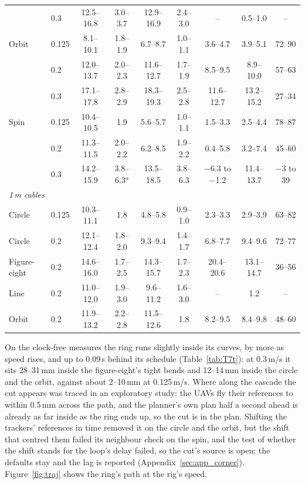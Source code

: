 \begin{table}[htbp]
\begin{tabular}{llccccccc}
 & 0.3 & 12.5--16.8 & 3.0--3.7 & 12.9--16.9 & 2.4--3.0 & -- & 0.5--1.0 & -- \\
\addlinespace
Orbit & 0.125 & 8.1--10.1 & 1.8--1.9 & 6.7--8.7 & 1.0--1.1 & 3.6--4.7 & 3.9--5.1 & 72--90 \\
 & 0.2 & 12.0--13.7 & 2.0--2.3 & 11.6--12.7 & 1.7--1.9 & 8.5--9.5 & 8.9--10.0 & 57--63 \\
 & 0.3 & 17.1--17.8 & 2.8--2.9 & 18.3--19.3 & 2.5--2.8 & 11.6--12.7 & 13.2--15.2 & 27--34 \\
\addlinespace
Spin & 0.125 & 10.4--10.5 & 1.9 & 5.6--5.7 & 1.0--1.1 & 1.5--3.3 & 2.5--4.4 & 78--87 \\
 & 0.2 & 11.3--11.5 & 2.0--2.2 & 6.2--8.5 & 1.9--2.2 & 0.4--5.8 & 3.2--7.4 & 45--60 \\
 & 0.3 & 14.2--15.9 & 3.8--6.3$^a$ & 13.5--18.5 & 3.8--6.3 & $-$6.3 to $-$1.2 & 11.4--13.7 & $-$3 to 39 \\
\midrule
\multicolumn{9}{l}{\emph{1\,m cables}} \\
Circle & 0.125 & 10.3--11.1 & 1.8 & 4.8--5.8 & 0.9--1.0 & 2.3--3.3 & 2.9--3.9 & 63--82 \\
Circle & 0.2 & 12.1--12.4 & 1.8--2.0 & 9.3--9.4 & 1.4--1.7 & 6.8--7.7 & 9.4--9.6 & 72--77 \\
Figure-eight & 0.2 & 14.6--16.0 & 1.7--2.5 & 14.3--15.7 & 1.7--2.3 & 20.4--20.6 & 13.1--14.7 & 36--56 \\
Line & 0.2 & 11.0--12.0 & 1.9--3.0 & 9.6--11.2 & 1.6--3.0 & -- & 1.2 & -- \\
Orbit & 0.2 & 11.9--13.2 & 2.2--2.8 & 11.5--12.6 & 1.8 & 8.2--9.5 & 8.4--9.8 & 48--60 \\
\bottomrule
\end{tabular}
\end{table}

On the clock-free measures the ring runs slightly inside its curves, by more as speed rises, and up to 0.09\,s
behind its schedule (Table~\ref{tab:T7t}): at 0.3\,m/s it sits 28--31\,mm inside the figure-eight's tight bends and
12--14\,mm inside the circle and the orbit, against about 2--10\,mm at 0.125\,m/s. Where along the cascade the cut appears was traced in an exploratory study: the UAVs fly their
references to within 0.5\,mm across the path, and the planner's own plan half a second ahead is already as far
inside as the ring ends up, so the cut is in the plan. Shifting the trackers' references in time removed it on the
circle and the orbit, but the shift that centred them failed its neighbour check on the spin, and the test of whether
the shift stands for the loop's delay failed, so the cut's source is open; the defaults stay and the lag is reported
(Appendix~\ref{sec:app_corner}). Figure~\ref{fig:traj} shows the ring's path at the rig's speed.

